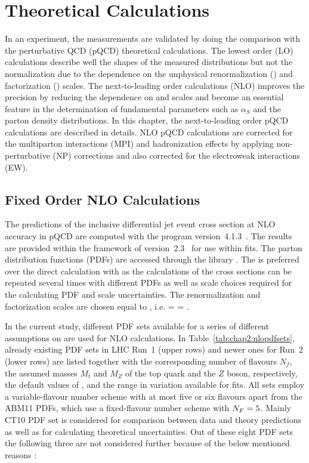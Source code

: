\chapter{Theoretical Calculations}
\label{chap:Theory_Predictions}

In an experiment, the measurements are validated by doing the comparison with the perturbative QCD (pQCD) theoretical calculations. The lowest order (LO) calculations describe well the shapes of the measured distributions but not the normalization due to the dependence on the unphysical renormalization (\mur) and factorization (\muf) scales. The next-to-leading order calculations (NLO) improves the precision by reducing the dependence on \mur and \muf scales and become an essential feature in the determination of fundamental parameters such as $\alpha_S$ and the parton density distributions. In this chapter, the next-to-leading order pQCD calculations are described in details. NLO pQCD calculations are corrected for the multiparton interactions (MPI) and hadronization effects by applying non-perturbative (NP) corrections and also corrected for the electroweak interactions (EW).

\section{Fixed Order NLO Calculations}
The predictions of the inclusive differential jet event cross section at NLO accuracy in pQCD are computed with the \NLOJETPP program version~4.1.3~\cite{Nagy:2001fj,Nagy:2003tz}. The results are provided within the framework of \fastNLO version~2.3~\cite{Kluge:2006xs,Britzger:2012bs} for use within fits. The parton distribution functions (PDFs) are accessed through the \LHAPDFS library \cite{Whalley:2005nh,Buckley:2014ana}. The \fastNLO is preferred over the direct calculation with \NLOJETPP as the calculations of the cross sections can be repeated several times with different PDFs as well as scale choices required for the calculating PDF and scale uncertainties. The renormalization and factorization scales are chosen equal to \httwo, i.e. \mur = \muf = \httwo. 

In the current study, different PDF sets available for a series of different assumptions on \alpsmz are used for NLO calculations. In Table~\ref{tab:chap2:nlopdfsets}, already existing PDF sets in LHC Run~1 (upper rows) and newer ones for Run~2 (lower rows) are listed together with the corresponding number of flavours $N_f$, the assumed masses $M_t$ and $M_Z$ of the top quark and the $Z$ boson, respectively, the default values of \alpsmz, and the range in \alpsmz variation available for fits. All sets employ a variable-flavour number scheme with at most five or six flavours apart from the ABM11 PDFs, which use a fixed-flavour number scheme with $N_F=5$. Mainly CT10 PDF set is considered for comparison between data and theory predictions as well as for calculating theoretical uncertainties. Out of these eight PDF sets the following three are not considered further because of the below mentioned reasons :

